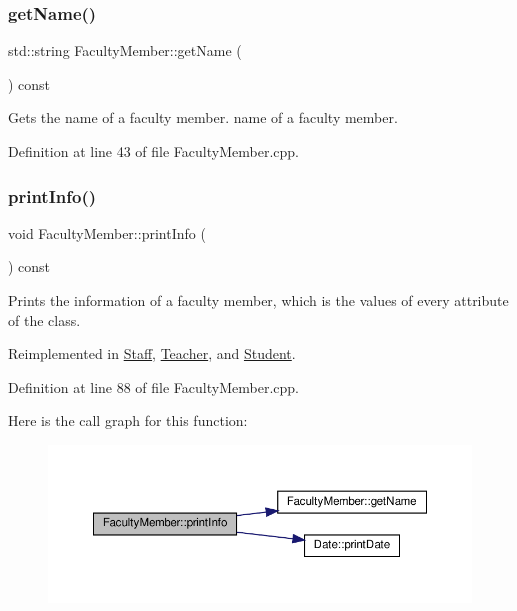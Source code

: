 \subsubsection{\texorpdfstring{get\+Name()}{getName()}}
{\footnotesize\ttfamily std\+::string Faculty\+Member\+::get\+Name (\begin{DoxyParamCaption}{ }\end{DoxyParamCaption}) const}

Gets the name of a faculty member.  name of a faculty member. 

Definition at line 43 of file Faculty\+Member.\+cpp.

\mbox{\label{classFacultyMember_af07c814d58d1a2e309c74a0c57b95fd1}} 
\subsubsection{\texorpdfstring{print\+Info()}{printInfo()}}
{\footnotesize\ttfamily void Faculty\+Member\+::print\+Info (\begin{DoxyParamCaption}{ }\end{DoxyParamCaption}) const\hspace{0.3cm}{\ttfamily [virtual]}}

Prints the information of a faculty member, which is the values of every attribute of the class. 

Reimplemented in \hyperlink{classStaff_a3b9babe4708b787b8aeb4d02be4ba1eb}{Staff}, \hyperlink{classTeacher_ae1fc6d174a25c714bfb73abf4620de03}{Teacher}, and \hyperlink{classStudent_a3567f5c4220ffa88a8855998b3b99b43}{Student}.



Definition at line 88 of file Faculty\+Member.\+cpp.

Here is the call graph for this function\+:\nopagebreak
\begin{figure}[H]
\begin{center}
\leavevmode
\includegraphics[width=350pt]{classFacultyMember_af07c814d58d1a2e309c74a0c57b95fd1_cgraph}
\end{center}
\end{figure}
\mbox{\label{classFacultyMember_a25dc17f307ac885a7b3722a7685cb517}} 
